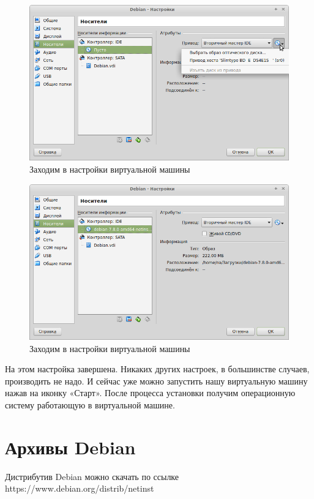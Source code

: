 \documentclass[12pt,a4paper]{article}
\begin{document}
\begin{figure}[h!]
\centering
\includegraphics[scale=0.45]{res/choose}
\caption{Заходим в настройки виртуальной машины}
\end{figure}

\begin{figure}[h!]
\centering
\includegraphics[scale=0.45]{res/chooseiso}
\caption{Заходим в настройки виртуальной машины}
\end{figure}

На этом настройка завершена. Никаких других настроек, в большинстве случаев, производить не надо. И сейчас уже можно запустить нашу виртуальную машину нажав на иконку «Старт». После процесса установки получим операционную систему работающую в виртуальной машине.

\newpage
\section{Архивы Debian}
Дистрибутив Debian можно скачать по ссылке https://www.debian.org/distrib/netinst
\end{document}
